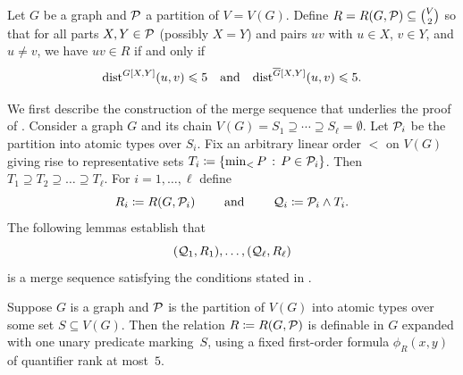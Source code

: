 \begin{definition}
    Let $G$ be a graph and $\mathcal P$ a partition of $V = V(G)$.
    Define $R = R(G,\mathcal P) \subseteq \binom{V}{2}$ so that for all parts $X,Y \in \mathcal P$ (possibly $X = Y$) and pairs $uv$ with $u \in X$, $v \in Y$, and $u \ne v$, we have
    $uv \in R$ if and only if
    \[
    \mathrm{dist}^{G[X,Y]}(u,v) \leqslant 5 \quad \text{and} \quad \mathrm{dist}^{\overline{G}[X,Y]}(u,v) \leqslant 5. \]
\end{definition}

We first describe the construction of the merge sequence that underlies the proof of .
Consider a graph $G$ and its chain 
    $V(G)=S_1\supseteq\cdots\supseteq S_\ell=\emptyset$.
    Let $\mathcal P_i$ be the partition into atomic types over $S_i$.
    Fix an arbitrary linear order $<$ on $V(G)$ 
    giving rise to representative sets $T_i \coloneqq \{\min_< P \,:\, P \in \mathcal P_i\}$. 
    Then $T_1\supseteq T_2\supseteq \dots \supseteq T_\ell$.
    For $i=1,\ldots,\ell$ define $$R_i \coloneqq R(G,\mathcal P_i)\qquad\text{ and }\qquad\mathcal Q_i \coloneqq \mathcal P_i \wedge T_i.$$
    The following lemmas establish that 
    $$(\mathcal Q_1,R_1),\ldots,(\mathcal Q_\ell,R_\ell)$$ is a merge sequence satisfying the conditions stated in . 
    


\begin{lemma}\label{lem:def-R}
    Suppose $G$ is a graph and $\mathcal P$ is the partition of $V(G)$ into atomic types over some set $S \subseteq V(G)$. Then the relation $R \coloneqq R(G,\mathcal P)$ is definable in $G$ expanded with one unary predicate marking~$S$, using a fixed first-order formula $\phi_R(x,y)$ of quantifier rank at most~$5$.
\end{lemma}


